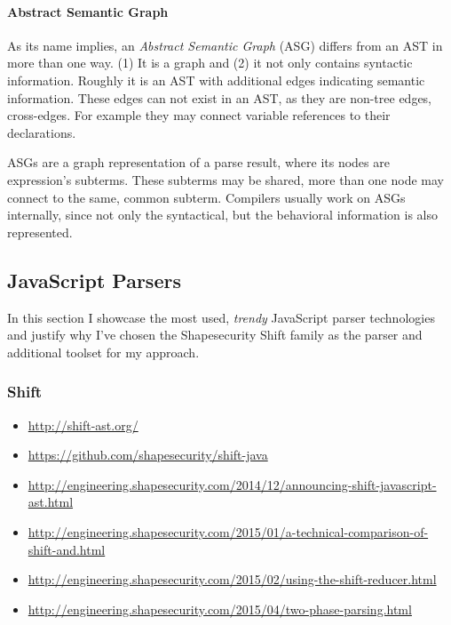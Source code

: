 \paragraph{Abstract Semantic Graph}
As its name implies, an \emph{Abstract Semantic Graph} (ASG) differs from an AST in more than one way. (1) It is a graph and (2) it not only contains syntactic information. Roughly it is an AST with additional edges indicating semantic information. These edges can not exist in an AST, as they are non-tree edges, cross-edges. For example they may connect variable references to their declarations.~\cite{raghavan_dex:_2004}

ASGs are a graph representation of a parse result, where its nodes are expression's subterms. These subterms may be shared, more than one node may connect to the same, common subterm. Compilers usually work on ASGs internally, since  not only the syntactical, but the behavioral information is also represented.



\subsection{JavaScript Parsers}
In this section I showcase the most used, \emph{trendy} JavaScript parser technologies and justify why I've chosen the Shapesecurity Shift family as the parser and additional toolset for my approach.

\subsubsection{Shift}
\begin{itemize}
	\item \url{http://shift-ast.org/}
	\item \url{https://github.com/shapesecurity/shift-java}
	\item \url{http://engineering.shapesecurity.com/2014/12/announcing-shift-javascript-ast.html}
	\item \url{http://engineering.shapesecurity.com/2015/01/a-technical-comparison-of-shift-and.html}
	\item \url{http://engineering.shapesecurity.com/2015/02/using-the-shift-reducer.html}
	\item \url{http://engineering.shapesecurity.com/2015/04/two-phase-parsing.html}
\end{itemize}


